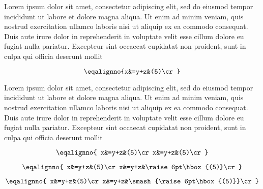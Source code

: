 Lorem ipsum dolor sit amet, consectetur adipiscing elit, sed do eiusmod tempor
incididunt ut labore et dolore magna aliqua. Ut enim ad minim veniam, quis
nostrud exercitation ullamco laboris nisi ut aliquip ex ea commodo consequat.
Duis aute irure dolor in reprehenderit in voluptate velit esse cillum dolore eu
fugiat nulla pariatur. Excepteur sint occaecat cupidatat non proident, sunt in
culpa qui officia deserunt mollit %

$$\eqalignno{x&=y+z&(5)\cr}$$

Lorem ipsum dolor sit amet, consectetur adipiscing elit, sed do eiusmod tempor
incididunt ut labore et dolore magna aliqua. Ut enim ad minim veniam, quis
nostrud exercitation ullamco laboris nisi ut aliquip ex ea commodo consequat.
Duis aute irure dolor in reprehenderit in voluptate velit esse cillum dolore eu
fugiat nulla pariatur. Excepteur sint occaecat cupidatat non proident, sunt in
culpa qui officia deserunt mollit %

$$\eqalignno{
x&=y+z&(5)\cr
x&=y+z&(5)\cr
}$$

$$\eqalignno{
x&=y+z&(5)\cr
x&=y+z&\raise6pt\hbox{(5)}\cr
}$$

$$\eqalignno{
x&=y+z&(5)\cr
x&=y+z&\smash{\raise6pt\hbox{(5)}}\cr
}$$


\bye


